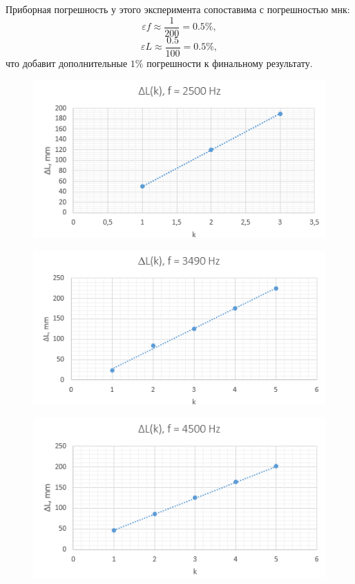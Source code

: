 \documentclass[12pt,a4paper]{article}
\begin{document}
Приборная погрешность у этого эксперимента сопоставима с погрешностью мнк:
$$\varepsilon f \approx \frac{1}{200} = 0.5\%,$$
$$\varepsilon L \approx \frac{0.5}{100} = 0.5\%,$$
что добавит дополнительные $1\%$ погрешности к финальному результату.\\
\begin{figure}[h]
    \centering
    \begin{center}
    \end{center}
    \includegraphics[width=10 cm]{plot1.PNG}
    \label{fig:plot1}
\end{figure} 
\begin{figure}[h]
    \centering
    \begin{center}
    \end{center}
    \includegraphics[width=10 cm]{plot2.PNG}
    \label{fig:plot2}
\end{figure} 
\begin{figure}[h]
    \centering
    \begin{center}
    \end{center}
    \includegraphics[width=10 cm]{plot3.PNG}
    \label{fig:plot3}
\end{figure} 
\end{document}
